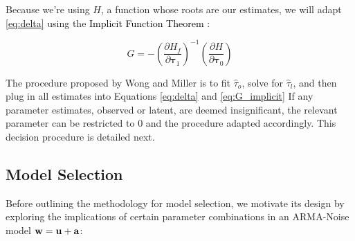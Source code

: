 Because we're using $H$, a function whose roots are our estimates, we will adapt \ref{eq:delta} using the \textcolor{black}{Implicit Function Theorem} \cite{babyrudin}:

\begin{equation}
    G = -\left(\frac{\partial H_f}{\partial \bm{\tau}_1}\right)^{-1}
  \left(\frac{\partial H}{\partial \bm{\tau}_0}\right)
  \label{eq:G_implicit}
\end{equation}



The procedure proposed by Wong and Miller is to fit $\hat{\tau}_o$, solve for $\hat{\tau}_l$, and then plug in all estimates into Equations \ref{eq:delta} and \ref{eq:G_implicit}
If any parameter estimates, observed or latent, are deemed insignificant, the relevant parameter can be restricted to 0 and the procedure
adapted accordingly. This decision procedure is detailed next.




\subsection{Model Selection}
Before outlining the methodology for model selection, we motivate its design by exploring the 
implications of certain parameter combinations in an ARMA-Noise model ${\mathbf{w}} = \mathbf{u} + \mathbf{a} $:

